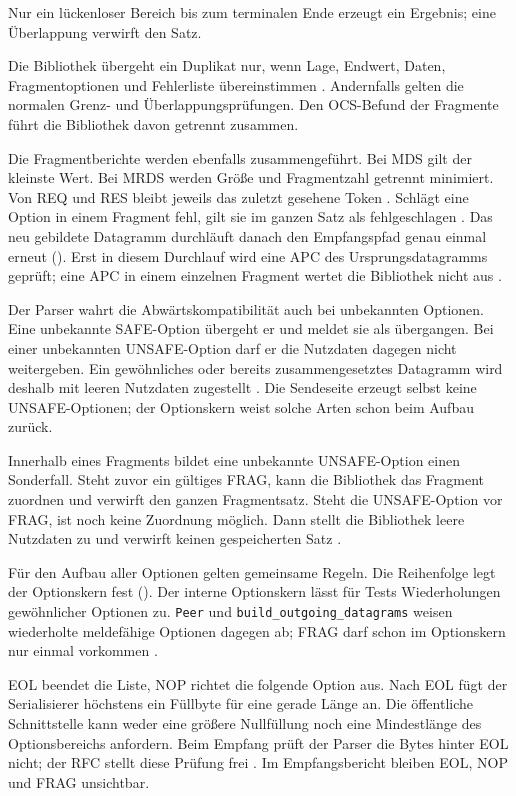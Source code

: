 Nur ein lückenloser Bereich bis zum terminalen Ende erzeugt ein Ergebnis; eine Überlappung verwirft den
Satz.

Die Bibliothek übergeht ein Duplikat nur, wenn Lage, Endwert, Daten, Fragment\-optionen und Fehlerliste
übereinstimmen \cite[Sec.~11.4]{rfc9868}. Andernfalls gelten die normalen Grenz- und
Überlappungsprüfungen. Den OCS-Befund der Fragmente führt die Bibliothek davon getrennt zusammen.

Die Fragmentberichte werden ebenfalls zusammengeführt. Bei MDS gilt der kleinste Wert. Bei MRDS werden
Größe und Fragmentzahl getrennt minimiert. Von REQ und RES bleibt jeweils das zuletzt gesehene Token
\cite[Sec.~11.5 bis 11.7]{rfc9868}. Schlägt eine Option in einem Fragment fehl, gilt sie im ganzen
Satz als fehlgeschlagen \cite[Sec.~15]{rfc9868}. Das neu gebildete Datagramm durchläuft
danach den Empfangspfad genau einmal erneut (). Erst in diesem Durchlauf
wird eine APC des Ursprungsdatagramms geprüft; eine APC in einem einzelnen Fragment wertet die
Bibliothek nicht aus \cite[Sec.~11.3]{rfc9868}.

Der Parser wahrt die Abwärtskompatibilität auch bei unbekannten Optionen. Eine unbekannte SAFE-Option
übergeht er und meldet sie als übergangen. Bei einer unbekannten UNSAFE-Option darf er die Nutzdaten
dagegen nicht weitergeben. Ein gewöhnliches oder bereits zusammengesetztes Datagramm wird deshalb mit
leeren Nutzdaten zugestellt \cite[Sec.~10, 12 und 14]{rfc9868}. Die Sendeseite erzeugt selbst keine
UNSAFE-Optionen; der Optionskern weist solche Arten schon beim Aufbau zurück.

Innerhalb eines Fragments bildet eine unbekannte UNSAFE-Option einen Sonder\-fall. Steht zuvor ein
gültiges FRAG, kann die Bibliothek das Fragment zuordnen und verwirft den ganzen Fragmentsatz. Steht die
UNSAFE-Option vor FRAG, ist noch keine Zuordnung möglich. Dann stellt die Bibliothek leere Nutzdaten
zu und verwirft keinen gespeicherten Satz \cite[Sec.~10, 12 und 14]{rfc9868}.

Für den Aufbau aller Optionen gelten gemeinsame Regeln. Die Reihenfolge legt der Optionskern fest
(). Der interne Optionskern lässt für Tests Wiederholungen gewöhnlicher Optionen
zu. \texttt{Peer} und \texttt{build\_outgoing\_datagrams} weisen wiederholte meldefähige Optionen dagegen
ab; FRAG darf schon im Optionskern nur einmal vorkommen \cite[Sec.~10]{rfc9868}.

EOL beendet die Liste, NOP richtet die folgende Option aus. Nach EOL fügt der Serialisierer höchstens ein
Füllbyte für eine gerade Länge an. Die öffentliche Schnittstelle kann weder eine größere Nullfüllung noch
eine Mindestlänge des Options\-bereichs anfordern. Beim Empfang prüft der Parser die Bytes hinter EOL
nicht; der RFC stellt diese Prüfung frei \cite[Sec.~11.1]{rfc9868}. Im Empfangsbericht bleiben EOL, NOP
und FRAG unsichtbar.


